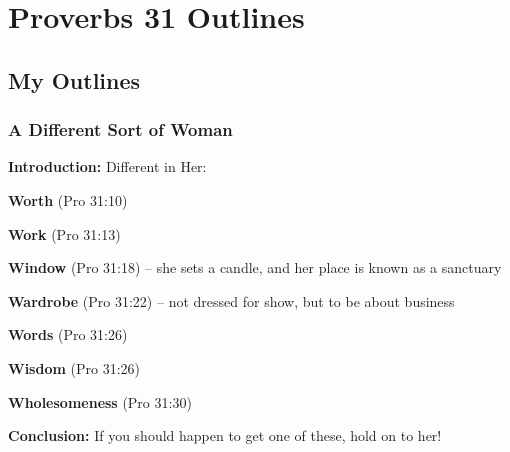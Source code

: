 \section{Proverbs 31 Outlines}

\subsection{My Outlines}

\subsubsection{A Different Sort of Woman}
\textbf{Introduction:} Different in Her:
\begin{compactenum}[I.]
    \item \textbf{Worth} (Pro 31:10)
    \item \textbf{Work} (Pro 31:13)
    \item \textbf{Window} (Pro 31:18) -- she sets a candle, and her place is known as a sanctuary
    \item \textbf{Wardrobe} (Pro 31:22) -- not dressed for show, but to be about business
    \item \textbf{Words} (Pro 31:26)
    \item \textbf{Wisdom} (Pro 31:26)
    \item \textbf{Wholesomeness} (Pro 31:30)
\end{compactenum}
\textbf{Conclusion:} If you should happen to get one of these, hold on to her!

